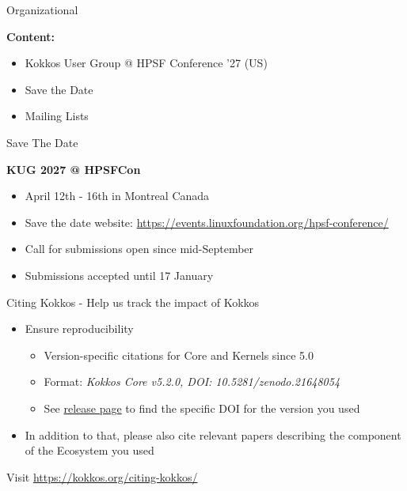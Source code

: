 
\begin{frame}[fragile]

  {\Huge Organizational}

  \vspace{15pt}

  \textbf{Content:}
  \begin{itemize}
    \item Kokkos User Group @ HPSF Conference '27 (US)
    \item Save the Date
    \item Mailing Lists
  \end{itemize}

\end{frame}


\begin{frame}[fragile]{Save The Date}

\textbf{KUG 2027 @ HPSFCon}
\begin{itemize}
\item April 12th - 16th in Montreal Canada
\item Save the date website: \url{https://events.linuxfoundation.org/hpsf-conference/}
\item Call for submissions open since mid-September
\item Submissions accepted until 17 January
\end{itemize}

\end{frame}


\begin{frame}[fragile]{Citing Kokkos - Help us track the impact of Kokkos}

\begin{itemize}
\item Ensure reproducibility
  \begin{itemize}
  \item Version-specific citations for Core and Kernels since 5.0
  \item Format: \emph{Kokkos Core v5.2.0, DOI: 10.5281/zenodo.21648054}
  \item See \href{https://kokkos.org/about/releases/}{release page} to find the specific DOI for the version you used
  \end{itemize}
\item In addition to that, please also cite relevant papers describing the component of the Ecosystem you used
\end{itemize}

Visit \url{https://kokkos.org/citing-kokkos/}

\end{frame}

